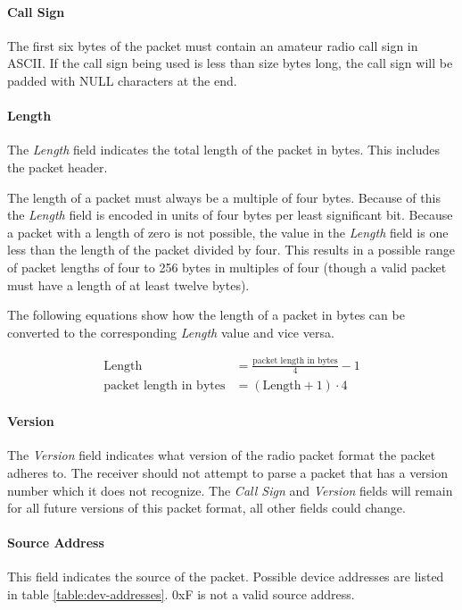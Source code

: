 \paragraph{Call Sign}
The first six bytes of the packet must contain an amateur radio call sign in ASCII. If the call sign being used is less
than size bytes long, the call sign will be padded with NULL characters at the end.

\paragraph{Length}
The \emph{Length} field indicates the total length of the packet in bytes. This includes the packet header.

The length of a packet must always be a multiple of four bytes. Because of this the \emph{Length} field is encoded in
units of four bytes per least significant bit. Because a packet with a length of zero is not possible, the value in the
\emph{Length} field is one less than the length of the packet divided by four. This results in a possible range of
packet lengths of four to 256 bytes in multiples of four (though a valid packet must have a length of at least twelve
bytes).

The following equations show how the length of a packet in bytes can be converted to the corresponding \emph{Length}
value and vice versa.

\begin{align*}
    \text{Length}                 & = \frac{\text{packet length in bytes}}{4} - 1 \\
    \text{packet length in bytes} & = \left(\text{Length} + 1\right) \cdot 4
\end{align*}

\paragraph{Version}
The \emph{Version} field indicates what version of the radio packet format the packet adheres to. The receiver should
not attempt to parse a packet that has a version number which it does not recognize. The \emph{Call Sign} and
\emph{Version} fields will remain for all future versions of this packet format, all other fields could change.

\paragraph{Source Address}
This field indicates the source of the packet. Possible device addresses are listed in table \ref{table:dev-addresses}.
0xF is not a valid source address.

